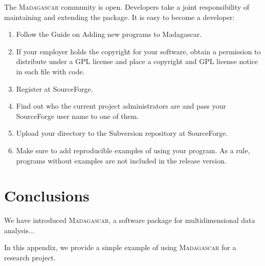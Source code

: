 The \textsc{Madagascar} community is open. Developers take a joint
responsibility of maintaining and extending the package. It is easy to
become a developer:
\begin{enumerate}
\item  Follow the Guide on Adding new programs to Madagascar.
\item  If your employer holds the copyright for your software, 
obtain a permission to distribute under a GPL license and place a
copyright and GPL license notice in each file with code.
\item Register at SourceForge.
\item Find out who the current project administrators are and pass your SourceForge
user name to one of them.
\item Upload your directory to the Subversion repository at SourceForge.
\item Make sure to add reproducible examples of using your program. 
As a rule, programs without examples are not included in the release
version.
\end{enumerate}	

\section{Conclusions}

We have introduced \textsc{Madagascar}, a software package for
multidimensional data analysis...





In this appendix, we provide a simple example of using
\textsc{Madagascar} for a research project.


